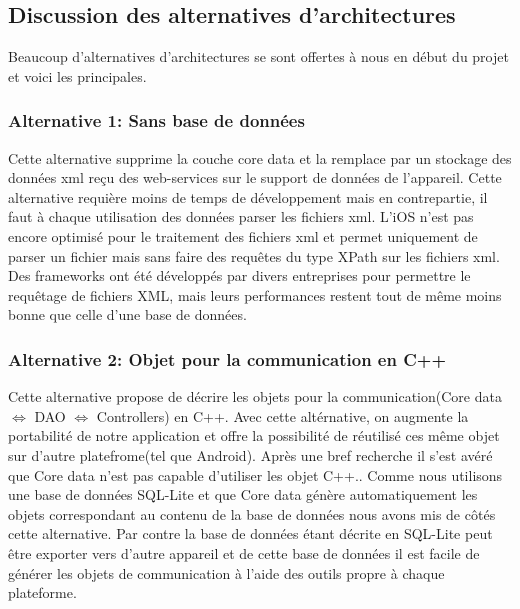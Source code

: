 	\subsection{Discussion des alternatives d'architectures}
		Beaucoup d'alternatives d'architectures se sont offertes à nous en début du projet et voici les principales.
		
		\subsubsection{Alternative 1: Sans base de données }
		Cette alternative supprime la couche core data et la remplace par un stockage des données xml reçu des web-services sur le support de données de l'appareil. Cette alternative requière moins de temps de développement mais en contrepartie, il faut à chaque utilisation des données parser les fichiers xml. L'iOS n'est pas encore optimisé pour le traitement des fichiers xml et permet uniquement de parser un fichier mais sans faire des requêtes du type XPath sur les fichiers xml. Des frameworks ont été développés par divers entreprises pour permettre le requêtage de fichiers XML, mais leurs performances restent tout de même moins bonne que celle d'une base de données.
		
		\subsubsection{Alternative 2: Objet pour la communication en C++ }
		Cette alternative propose de décrire les objets pour la communication(Core data \begin{math} \Leftrightarrow \end{math} DAO  \begin{math} \Leftrightarrow \end{math} Controllers) en C++. Avec cette altérnative, on augmente la portabilité de notre application et offre la possibilité de réutilisé ces même objet sur d'autre platefrome(tel que Android). Après une bref recherche il s'est avéré que Core data n'est pas capable d'utiliser les objet C++.. Comme nous utilisons une base de données SQL-Lite et que Core data génère automatiquement les objets correspondant  au contenu de la base de données nous avons mis de côtés cette alternative.  Par contre la base de données étant décrite en SQL-Lite peut être exporter vers d'autre appareil et de cette base de données il est facile de générer les objets de communication à l'aide des outils propre à chaque plateforme.
				
